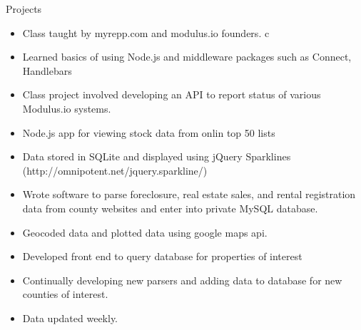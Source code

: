 \begin{category}{Projects}


\begin{itemize}
\item Class taught by myrepp.com and modulus.io founders.
c\item Learned basics of using Node.js and middleware packages such as Connect, Handlebars
\item Class project involved developing an API to report status of various Modulus.io systems.
\end{itemize}

\ifWebLinks
{}
\else
{} 
\fi

\begin{itemize}
\item Node.js app for viewing stock data from onlin top 50 lists
\item Data stored in SQLite and displayed using jQuery Sparklines (http://omnipotent.net/jquery.sparkline/)
\end{itemize}


\begin{itemize}
\item Wrote software to parse foreclosure, real estate sales, and rental registration data from county websites and enter into private MySQL database.
\item Geocoded data and plotted data using google maps api.
\item Developed front end to query database for properties of interest
\item Continually developing new parsers and adding data to database for new counties of interest.
\item Data updated weekly.


\end{itemize}
\end{category}
